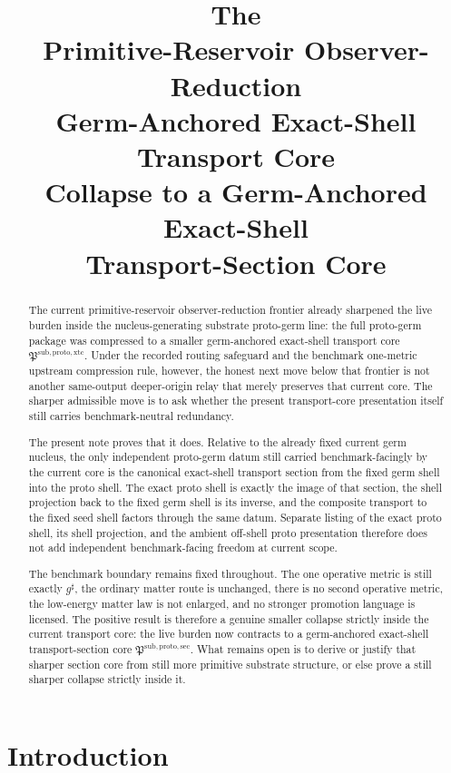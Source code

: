 \documentclass[11pt]{article}
\title{\textbf{The \TheoryName{}}\\[0.4em]
\large Primitive-Reservoir Observer-Reduction\\
\large Germ-Anchored Exact-Shell Transport Core\\
\large Collapse to a Germ-Anchored Exact-Shell\\
\large Transport-Section Core}
\author{}
\date{}
\newcommand{\CompletedMetric}{g^{\sharp}}
\newcommand{\ProtoTransportCore}{\mathfrak P^{\mathrm{sub,proto,xtc}}}
\newcommand{\ProtoSectionCore}{\mathfrak P^{\mathrm{sub,proto,sec}}}
\begin{document}
\maketitle

\begin{abstract}
The current primitive-reservoir observer-reduction frontier already sharpened the live burden inside the nucleus-generating substrate proto-germ line: the full proto-germ package was compressed to a smaller germ-anchored exact-shell transport core \(\ProtoTransportCore\). Under the recorded routing safeguard and the benchmark one-metric upstream compression rule, however, the honest next move below that frontier is not another same-output deeper-origin relay that merely preserves that current core. The sharper admissible move is to ask whether the present transport-core presentation itself still carries benchmark-neutral redundancy.

The present note proves that it does. Relative to the already fixed current germ nucleus, the only independent proto-germ datum still carried benchmark-facingly by the current core is the canonical exact-shell transport section from the fixed germ shell into the proto shell. The exact proto shell is exactly the image of that section, the shell projection back to the fixed germ shell is its inverse, and the composite transport to the fixed seed shell factors through the same datum. Separate listing of the exact proto shell, its shell projection, and the ambient off-shell proto presentation therefore does not add independent benchmark-facing freedom at current scope.

The benchmark boundary remains fixed throughout. The one operative metric is still exactly \(\CompletedMetric\), the ordinary matter route is unchanged, there is no second operative metric, the low-energy matter law is not enlarged, and no stronger promotion language is licensed. The positive result is therefore a genuine smaller collapse strictly inside the current transport core: the live burden now contracts to a germ-anchored exact-shell transport-section core \(\ProtoSectionCore\). What remains open is to derive or justify that sharper section core from still more primitive substrate structure, or else prove a still sharper collapse strictly inside it.
\end{abstract}

\section{Introduction}
\end{document}
